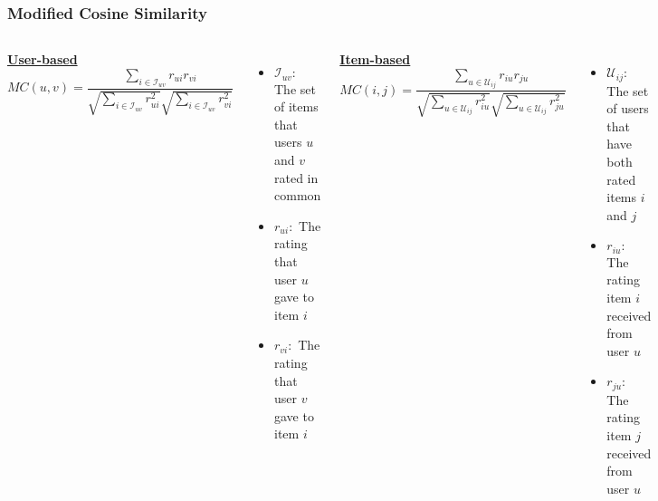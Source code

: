 \begin{frame}
    \frametitle{Modified Cosine Similarity}
    \begin{columns}
        \centering
        \underline{\textbf{User-based}}
        \begin{equation*}
            MC(u,v) = \frac{\sum_{i \in \mathcal{I}_{uv}}r_{ui}r_{vi}}
		   {\sqrt{\sum_{i \in \mathcal{I}_{uv}}r_{ui}^2}
                    \sqrt{\sum_{i \in \mathcal{I}_{uv}}r_{vi}^2}}
        \end{equation*}
        \tiny
        \begin{itemize}
            \item $\mathcal{I}_{uv}:$ The set of items that users $u$ and $v$ rated in common
            \item $r_{ui}:$ The rating that user $u$ gave to item $i$
            \item $r_{vi}:$ The rating that user $v$ gave to item $i$
        \end{itemize}
        \centering
        \underline{\textbf{Item-based}}
        \begin{equation*}
            MC(i,j) = \frac{\sum_{u \in \mathcal{U}_{ij}}r_{iu}r_{ju}}
		   {\sqrt{\sum_{u \in \mathcal{U}_{ij}}r_{iu}^2}
                    \sqrt{\sum_{u \in \mathcal{U}_{ij}}r_{ju}^2}}
        \end{equation*}
        \tiny
        \begin{itemize}
            \item $\mathcal{U}_{ij}:$ The set of users that have both rated items $i$ and $j$
            \item $r_{iu}:$ The rating item $i$ received from user $u$
            \item $r_{ju}:$ The rating item $j$ received from user $u$
        \end{itemize}
    \end{columns}
\end{frame}
